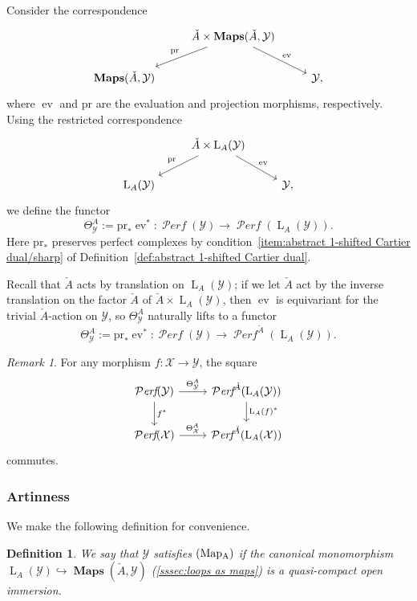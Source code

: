 \documentclass[12pt, oneside]{amsart}
\numberwithin{equation}{section}
\newtheorem{definition}[subsubsection]{Definition}
\theoremstyle{remark}
\newtheorem{remark}[subsubsection]{Remark}
\theoremstyle{plain}
\DeclareMathOperator{\PERF}{\mathcal{P}\textit{erf}}
\DeclareMathOperator{\MAP}{\mathbf{Maps}}
\newcommand{\Loop}{\operatorname{L}}
\newcommand{\YY}{\mathcal{Y}}
\newcommand{\XX}{\mathcal{X}}
\newcommand{\eval}{\operatorname{ev}}
\newcommand{\pr}{\mathrm{pr}}
\begin{document}
Consider the correspondence
\[ \begin{tikzcd}
    & \check{A} \times \MAP(\check{A}, \YY) \ar{rd}{\eval}\ar[swap]{ld}{\mathrm{pr}} & \\
    \MAP(\check{A}, \YY) & & \YY,
\end{tikzcd} \]
where $\eval$ and $\pr$ are the evaluation and projection morphisms, respectively.
Using the restricted correspondence
\[ \begin{tikzcd}
    & \check{A} \times \Loop_A(\YY) \ar{rd}{\eval}\ar[swap]{ld}{\mathrm{pr}} & \\
    \Loop_A(\YY) & & \YY,
\end{tikzcd} \]
we define the functor
$$\Theta^A_{\YY} := \mathrm{pr}_* \eval^* : \PERF(\YY) \to \PERF(\Loop_A(\YY)).$$
Here $\mathrm{pr}_*$ preserves perfect complexes by condition~\ref{item:abstract 1-shifted Cartier dual/sharp} of Definition~\ref{def:abstract 1-shifted Cartier dual}.

Recall that $\check{A}$ acts by translation on $\Loop_A(\YY)$; if we let $\check{A}$ act by the inverse translation on the factor $\check{A}$ of $\check{A} \times \Loop_A(\YY)$, then $\eval$ is equivariant for the trivial $\check{A}$-action on $\YY$, so $\Theta^A_{\YY}$ naturally lifts to a functor
$$\Theta^{A}_{\YY} := \mathrm{pr}_* \eval^* : \PERF(\YY) \to \PERF^{\check{A}}(\Loop_A(\YY)).$$

\begin{remark} For any morphism $f:\XX\rightarrow\YY$, the square \[\begin{tikzcd}
  \PERF(\YY) \ar{r}{\Theta^A_\YY}\ar{d}{f^*} & \PERF^{\check{A}}(\Loop_A(\YY)) \ar{d}{\Loop_A(f)^*}\\
  \PERF(\XX) \ar{r}{\Theta^A_\XX} & \PERF^{\check{A}}(\Loop_A(\XX))
\end{tikzcd}\]
commutes. \end{remark}

\subsubsection{Artinness}\label{sssec:ArtA}

We make the following definition for convenience.

\begin{definition}
  We say that $\YY$ \emph{satisfies $(\textup{Map}\textsubscript{A})$} if the canonical monomorphism $\Loop_A(\YY) \hookrightarrow \MAP(\check{A}, \YY)$ (\ref{sssec:loops as maps}) is a quasi-compact open immersion.
\end{definition}
\end{document}
